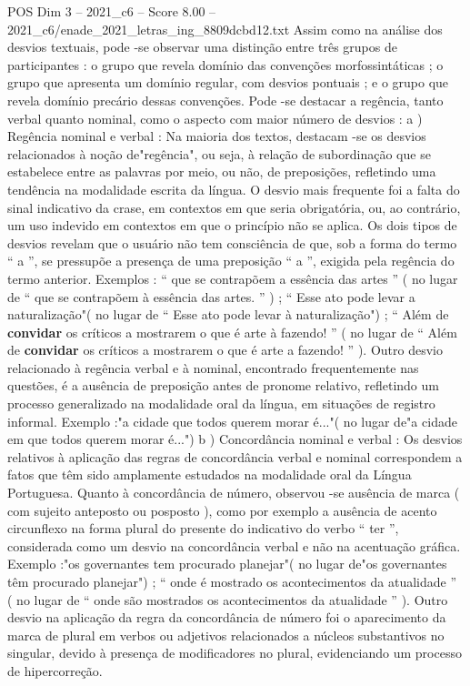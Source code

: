 \begin{textsample}{POS Dim 3 – 2021\_c6 – Score 8.00 – 2021\_c6/enade\_2021\_letras\_ing\_8809dcbd12.txt}
Assim como na análise dos desvios textuais, pode -se observar uma distinção entre três grupos de participantes : o grupo que revela domínio das convenções morfossintáticas ; o grupo que apresenta um domínio regular, com desvios pontuais ; e o grupo que revela domínio precário dessas convenções.
Pode -se destacar a regência, tanto verbal quanto nominal, como o aspecto com maior número de desvios : a ) Regência nominal e verbal : Na maioria dos textos, destacam -se os desvios relacionados à noção de"regência", ou seja, à relação de subordinação que se estabelece entre as palavras por meio, ou não, de preposições, refletindo uma tendência na modalidade escrita da língua.
O desvio mais frequente foi a falta do sinal indicativo da crase, em contextos em que seria obrigatória, ou, ao contrário, um uso indevido em contextos em que o princípio não se aplica.
Os dois tipos de desvios revelam que o usuário não tem consciência de que, sob a forma do termo “ a ”, se pressupõe a presença de uma preposição “ a ”, exigida pela regência do termo anterior.
Exemplos : “ que se contrapõem a essência das artes ” ( no lugar de “ que se contrapõem à essência das artes. ” ) ; “ Esse ato pode levar a naturalização"( no lugar de “ Esse ato pode levar à naturalização") ; “ Além de \textbf{convidar} os críticos a mostrarem o que é arte à fazendo! ” ( no lugar de “ Além de \textbf{convidar} os críticos a mostrarem o que é arte a fazendo! ” ).
Outro desvio relacionado à regência verbal e à nominal, encontrado frequentemente nas questões, é a ausência de preposição antes de pronome relativo, refletindo um processo generalizado na modalidade oral da língua, em situações de registro informal.
Exemplo :"a cidade que todos querem morar é..."( no lugar de"a cidade em que todos querem morar é...") b ) Concordância nominal e verbal : Os desvios relativos à aplicação das regras de concordância verbal e nominal correspondem a fatos que têm sido amplamente estudados na modalidade oral da Língua Portuguesa.
Quanto à concordância de número, observou -se ausência de marca ( com sujeito anteposto ou posposto ), como por exemplo a ausência de acento circunflexo na forma plural do presente do indicativo do verbo “ ter ”, considerada como um desvio na concordância verbal e não na acentuação gráfica.
Exemplo :"os governantes tem procurado planejar"( no lugar de"os governantes têm procurado planejar") ; “ onde é mostrado os acontecimentos da atualidade ” ( no lugar de “ onde são mostrados os acontecimentos da atualidade ” ).
Outro desvio na aplicação da regra da concordância de número foi o aparecimento da marca de plural em verbos ou adjetivos relacionados a núcleos substantivos no singular, devido à presença de modificadores no plural, evidenciando um processo de hipercorreção.

\end{textsample}
